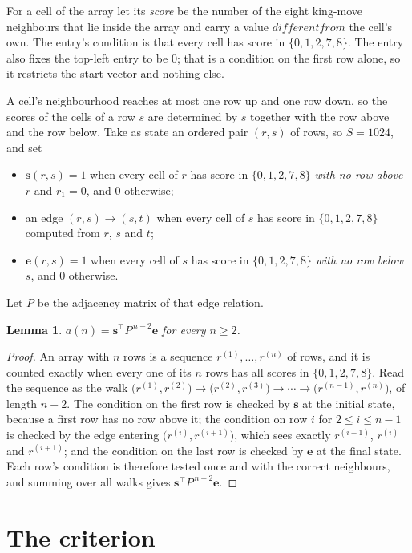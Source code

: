 \documentclass[11pt,a4paper]{article}
\theoremstyle{plain}
\newtheorem{lemma}[theorem]{Lemma}
\theoremstyle{definition}
\begin{document}
For a cell of the array let its \emph{score} be the number of the eight king-move neighbours that lie inside
the array and carry a value $different from$ the cell's own. The entry's condition is that every cell
has score in $\{0,1,2,7,8\}$. The entry also fixes the top-left entry to be $0$; that is a condition on the first row alone, so it restricts the start vector and nothing else.

A cell's neighbourhood reaches at most one row up and one row down, so the scores of the
cells of a row $s$ are determined by $s$ together with the row above and the row below.
Take as state an ordered pair $(r,s)$ of rows, so $S=1024$, and set
\begin{itemize}
\item $\mathbf{s}(r,s)=1$ when every cell of $r$ has score in $\{0,1,2,7,8\}$ \emph{with no row
above $r$} and $r_1=0$, and $0$ otherwise;
\item an edge $(r,s)\to(s,t)$ when every cell of $s$ has score in $\{0,1,2,7,8\}$ computed from
$r$, $s$ and $t$;
\item $\mathbf{e}(r,s)=1$ when every cell of $s$ has score in $\{0,1,2,7,8\}$ \emph{with no row
below $s$}, and $0$ otherwise.
\end{itemize}
Let $P$ be the adjacency matrix of that edge relation.

\begin{lemma}\label{lem:walk}
$a(n)=\mathbf{s}^{\!\top}P^{\,n-2}\mathbf{e}$ for every $n\ge2$.
\end{lemma}

\begin{proof}
An array with $n$ rows is a sequence $r^{(1)},\dots,r^{(n)}$ of rows, and it is counted
exactly when every one of its $n$ rows has all scores in $\{0,1,2,7,8\}$. Read the sequence as the
walk $\bigl(r^{(1)},r^{(2)}\bigr)\to\bigl(r^{(2)},r^{(3)}\bigr)\to\cdots\to
\bigl(r^{(n-1)},r^{(n)}\bigr)$, of length $n-2$. The condition on the first row is
checked by $\mathbf{s}$ at the initial state, because a first row has no row above it; the
condition on row $i$ for $2\le i\le n-1$ is checked by the edge entering
$\bigl(r^{(i)},r^{(i+1)}\bigr)$, which sees exactly $r^{(i-1)}$, $r^{(i)}$ and
$r^{(i+1)}$; and the condition on the last row is checked by $\mathbf{e}$ at the final
state. Each row's condition is therefore tested once and with the correct neighbours, and
summing over all walks gives $\mathbf{s}^{\!\top}P^{\,n-2}\mathbf{e}$.
\end{proof}

\section{The criterion}
\end{document}
